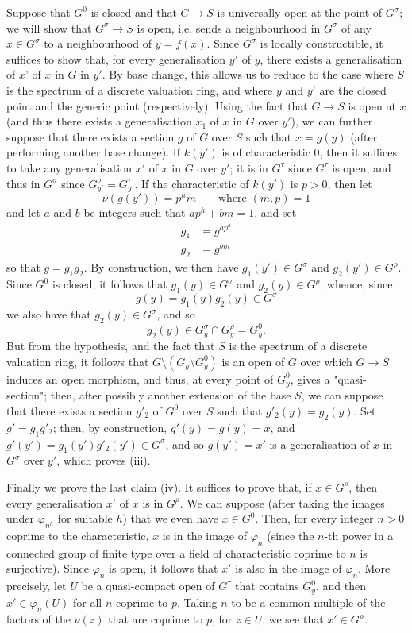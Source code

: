 Suppose that $G^0$ is closed and that $G\to S$ is universally open at the point of $G^\sigma$;
we will show that $G^\sigma\to S$ is open, i.e. sends a neighbourhood in $G^\sigma$ of any $x\in G^\sigma$ to a neighbourhood of $y=f(x)$.
Since $G^\sigma$ is locally constructible, it suffices to show that, for every generalisation $y'$ of $y$, there exists a generalisation of $x$' of $x$ in $G$ in $y'$.
By base change, this allows us to reduce to the case where $S$ is the spectrum of a discrete valuation ring, and where $y$ and $y'$ are the closed point and the generic point (respectively).
Using the fact that $G\to S$ is open at $x$ (and thus there exists a generalisation $x_1$ of $x$ in $G$ over $y'$), we can further suppose that there exists a section $g$ of $G$ over $S$ such that $x=g(y)$ (after performing another base change).
If $k(y')$ is of characteristic $0$, then it suffices to take any generalisation $x'$ of $x$ in $G$ over $y'$;
it is in $G^\tau$ since $G^\tau$ is open, and thus in $G^\sigma$ since $G_{y'}^\sigma=G_{y'}^\tau$.
If the characteristic of $k(y')$ is $p>0$, then let
\[
    \nu(g(y')) = p^hm \qquad\text{where }(m,p)=1
\]
and let $a$ and $b$ be integers such that $ap^h+bm=1$, and set
\[
    \begin{aligned}
        g_1 & = g^{ap^h} \\
        g_2 & = g^{bm}
    \end{aligned}
\]
so that $g=g_1g_2$.
By construction, we then have $g_1(y')\in G^\sigma$ and $g_2(y')\in G^\rho$.
Since $G^0$ is closed, it follows that $g_1(y)\in G^\sigma$ and $g_2(y)\in G^\rho$, whence, since
\[
    g(y) = g_1(y)g_2(y) \in G^\sigma
\]
we also have that $g_2(y)\in G^\sigma$, and so
\[
    g_2(y)\in G_y^\sigma\cap G_y^\rho = G_y^0.
\]
But from the hypothesis, and the fact that $S$ is the spectrum of a discrete valuation ring, it follows that $G\setminus(G_y\setminus G_y^0)$ is an open of $G$ over which $G\to S$ induces an open morphism, and thus, at every point of $G_y^0$, gives a "quasi-section";
then, after possibly another extension of the base $S$, we can suppose that there exists a section $g'_2$ of $G^0$ over $S$ such that $g'_2(y)=g_2(y)$.
Set $g'=g_1g'_2$;
then, by construction, $g'(y)=g(y)=x$, and $g'(y')=g_1(y')g'_2(y')\in G^\sigma$, and so $g(y')=x'$ is a generalisation of $x$ in $G^\sigma$ over $y'$, which proves (iii).

Finally we prove the last claim (iv).
It suffices to prove that, if $x\in G^\rho$, then every generalisation $x'$ of $x$ is in $G^\rho$.
We can suppose (after taking the images under $\varphi_{n^h}$ for suitable $h$) that we even have $x\in G^0$.
Then, for every integer $n>0$ coprime to the characteristic, $x$ is in the image of $\varphi_n$ (since the $n$-th power in a connected group of finite type over a field of characteristic coprime to $n$ is surjective).
Since $\varphi_n$ is open, it follows that $x'$ is also in the image of $\varphi_n$.
More precisely, let $U$ be a quasi-compact open of $G^\tau$ that contains $G_y^0$, and then $x'\in\varphi_n(U)$ for all $n$ coprime to $p$.
Taking $n$ to be a common multiple of the factors of the $\nu(z)$ that are coprime to $p$, for $z\in U$, we see that $x'\in G^\rho$.


